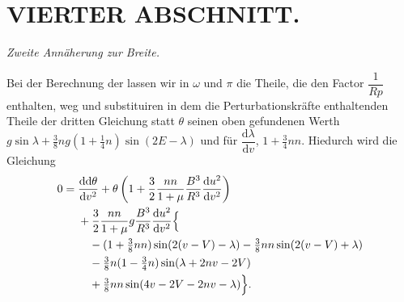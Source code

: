 \clearpage
\begingroup
{}
\renewcommand{\headrulewidth}{0pt}
\thispagestyle{VIIPrinted626}
\section*{VIERTER ABSCHNITT.}
\begin{center}
\itshape Zweite Annäherung zur Breite.
\end{center}

\par\noindent\hspace*{\parindent}Bei der Berechnung der  lassen wir in \(\omega\) und \(\pi\) die Theile, die
den Factor \(\dfrac{1}{Rp}\) enthalten, weg und substituiren in dem die Perturbationskräfte
enthaltenden Theile der dritten Gleichung statt \(\theta\) seinen oben gefundenen
Werth \(g\sin\lambda+\tfrac38ng(1+\tfrac14n)\sin(2E-\lambda)\) und für
\(\dfrac{\mathrm{d}\lambda}{\mathrm{d}v}\), \(1+\tfrac34nn\). Hiedurch wird die Gleichung
\[
\begin{aligned}
0={}&\frac{\mathrm{dd}\theta}{\mathrm{d}v^2}
+\theta\left(1+\frac32\frac{nn}{1+\mu}\frac{B^3}{R^3}
\frac{\mathrm{d}u^2}{\mathrm{d}v^2}\right)\\
&+\frac32\frac{nn}{1+\mu}g\frac{B^3}{R^3}\frac{\mathrm{d}u^2}{\mathrm{d}v^2}\Bigl\{\\
&\quad -(1+\tfrac38nn)\sin(2(v-V)-\lambda)
-\tfrac38nn\sin(2(v-V)+\lambda)\\
&\quad -\tfrac38n(1-\tfrac34n)\sin(\lambda+2nv-2V)\\
&\quad +\tfrac38nn\sin(4v-2V-2nv-\lambda)\Bigr\}.
\end{aligned}
\]

